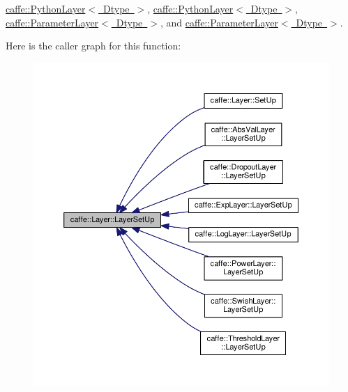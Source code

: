 \mbox{\hyperlink{classcaffe_1_1_python_layer_ae5baf7b7552ff0113c174b0e77db5f4c}{caffe\+::\+Python\+Layer$<$ Dtype $>$}}, \mbox{\hyperlink{classcaffe_1_1_python_layer_ae5baf7b7552ff0113c174b0e77db5f4c}{caffe\+::\+Python\+Layer$<$ Dtype $>$}}, \mbox{\hyperlink{classcaffe_1_1_parameter_layer_a1485ccdbd01513b89b29a79df7cda6ee}{caffe\+::\+Parameter\+Layer$<$ Dtype $>$}}, and \mbox{\hyperlink{classcaffe_1_1_parameter_layer_a1485ccdbd01513b89b29a79df7cda6ee}{caffe\+::\+Parameter\+Layer$<$ Dtype $>$}}.

Here is the caller graph for this function\+:
\nopagebreak
\begin{figure}[H]
\begin{center}
\leavevmode
\includegraphics[width=350pt]{classcaffe_1_1_layer_a481323a3e0972c682787f2137468c29f_icgraph}
\end{center}
\end{figure}
\mbox{\label{classcaffe_1_1_layer_a481323a3e0972c682787f2137468c29f}} 
